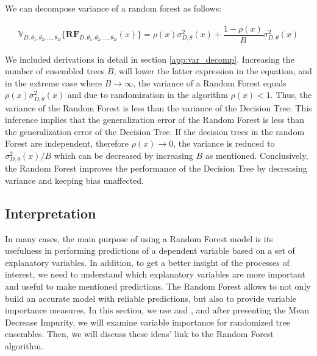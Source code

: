 We can decompose variance of a random forest as follows:

\begin{align}\label{eq:decomp_var}
\mathbb{V}_{D, \theta_{1}, \theta_{2},..., \theta_{B}}\{\boldsymbol{RF}_{D, \theta_{1},\theta_{2},..., \theta_{B}}(x) \}  = \rho(x)\sigma^2_{D,\theta}(x) + \dfrac{1-\rho(x)}{B}\sigma^2_{D,\theta}(x)
\end{align}

We included derivations in detail in section \ref{app:var_decomp}. 
Increasing the number of ensembled trees $B$, will lower the latter expression in the equation, and in the extreme 
case where $B \rightarrow \infty $, the variance of a Random Forest equals  $\rho(x)\sigma^2_{D,\theta}(x)$ 
and due to randomization in the algorithm $\rho(x) < 1$.
Thus, the variance of the Random Forest is less than the variance of the Decision Tree. 
This inference implies that the generalization error of the Random Forest is less 
than the generalization error of the Decision Tree. 
If the decision trees in the random Forest are independent, 
therefore $\rho(x) \rightarrow 0$, the variance is reduced to $\sigma^2_{D,\theta}(x)/B$ 
which can be decreased by increasing $B$ as mentioned. 
Conclusively, the Random Forest improves the performance of the Decision Tree by decreasing variance 
and keeping bias unaffected.

\subsection{Interpretation}
In many cases, the main purpose of using a Random Forest model is its usefulness in performing predictions 
of a dependent variable based on a set of explanatory variables. 
In addition, to get a better insight of the processes of interest, we need to understand
which explanatory variables are more important and useful to make mentioned predictions. 
The Random Forest allows to not only build an accurate model with reliable predictions, 
but also to provide variable importance measures.
In this section, we  use \cite{louppe2013understanding} 
and \cite{gerard2016foresttour}, and after presenting the Mean Decrease Impurity,
we will examine variable importance for randomized tree ensembles.
Then, we will discuss these ideas' link to the Random Forest algorithm.

